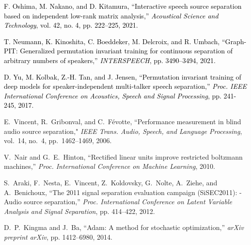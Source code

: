 \documentclass[honka]{nitkagawathesis}%
\newcommand{\red}[1]{\textcolor{black}{#1}}
\begin{document}
\begin{thebibliography}{99}
  \red{F. Oshima, M. Nakano, and D. Kitamura, ``Interactive speech source separation based on independent low-rank matrix analysis,'' \textit{Acoustical Science and Technology}, vol. 42, no. 4, pp. 222--225, 2021.}
  
  \red{T. Neumann, K. Kinoshita, C. Boeddeker, M. Delcroix, and R. Umbach, ``Graph-PIT: Generalized permutation invariant training for continuous separation of arbitrary numbers of speakers,'' \textit{INTERSPEECH}, pp. 3490--3494, 2021.}

  \red{ D. Yu, M. Kolbak, Z.-H. Tan, and J. Jensen, ``Permutation invariant training of deep models for speaker-independent multi-talker speech separation,'' \textit{Proc. IEEE International Conference on Acoustics, Speech and Signal Processing}, pp. 241-245, 2017. }

  E.~Vincent, R.~Gribonval, and C.~F\'{e}votte, ``Performance measurement in blind audio source separation," \textit{IEEE Trans. Audio, Speech, and Language Processing}, vol.~14, no.~4, pp.~1462--1469, 2006.
  
  V.~Nair and G.~E.~Hinton, ``Rectified linear units improve restricted boltzmann machines,'' 
  \textit{Proc. International Conference on Machine Learning}, 2010.
  
  S.~Araki, F.~Nesta, E.~Vincent, Z.~Koldovsky, G.~Nolte, A.~Ziehe, and A.~Benichoux, ``The 2011 signal separation evaluation campaign (SiSEC2011): -Audio source separation,'' \textit{Proc. International Conference on Latent Variable Analysis and Signal Separation}, pp. 414--422, 2012.
  
  D.~P.~Kingma and J.~Ba, ``Adam: A method for stochastic optimization,''
  \textit{arXiv preprint arXiv}, pp. 1412--6980, 2014.
  
\end{thebibliography}


% 



\appendix


\end{document}
